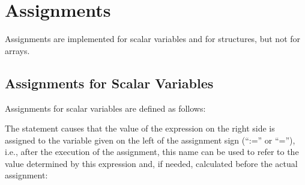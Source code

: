 
\section{Assignments}   %
\label{sec_assignments}

Assignments are implemented for scalar variables and for structures, but
not for arrays.

\begin{grammarframe}

\end{grammarframe}

\subsection{Assignments for Scalar Variables}   %

Assignments for scalar variables are defined as follows:

\begin{grammarframe}

\end{grammarframe}

The statement causes that the value of the expression on the right side
is assigned to the variable given on the left of the assignment sign
(``:='' or ``=''), i.e., after the execution of the assignment, this
name can be used to refer to the value determined by this expression
and, if needed, calculated before the actual assignment:

